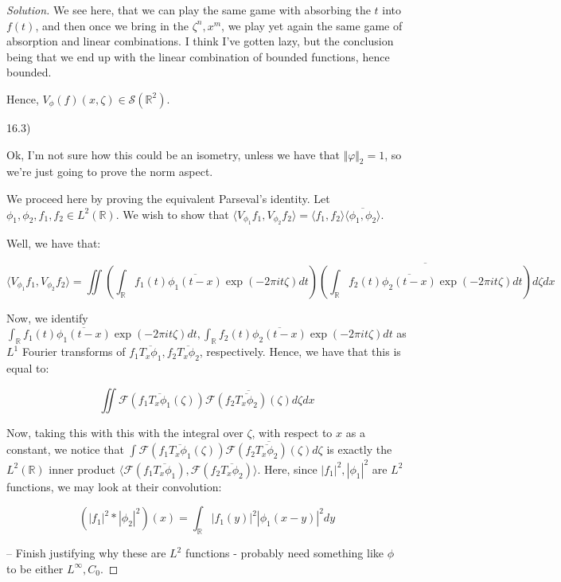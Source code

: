 \documentclass[10pt]{article}
\begin{document}
\begin{proof}[Solution]
We see here, that we can play the same game with absorbing the $t$ into $f(t)$, and then once we bring in the $\zeta^n, x^m$, we play yet again the same game of absorption and linear combinations. I think I've gotten lazy, but the conclusion being that we end up with the linear combination of bounded functions, hence bounded.

Hence, $V_\phi(f)(x, \zeta) \in \mathcal{S}(\mathbb{R}^2)$. 

16.3)

Ok, I'm not sure how this could be an isometry, unless we have that $\Vert \varphi \Vert_2 = 1$, so we're just going to prove the norm aspect.

We proceed here by proving the equivalent Parseval's identity. Let $\phi_1, \phi_2, f_1, f_2 \in L^2(\mathbb{R})$. We wish to show that $\langle V_{\phi_1} f_1, V_{\phi_2} f_2 \rangle = \langle f_1, f_2 \rangle \overline{\langle \phi_1, \phi_2 \rangle}$.

Well, we have that:

$$ \langle V_{\phi_1} f_1, V_{\phi_2} f_2 \rangle = \iint  \left( \int_{\mathbb{R}} f_1(t) \overline{\phi_1(t - x)} \exp( -2 \pi i t \zeta) dt \right) \overline{\left( \int_{\mathbb{R}}  f_2(t) \overline{\phi_2(t - x)} \exp(-2 \pi i t \zeta) dt \right)} d\zeta dx $$

Now, we identify $\int_{\mathbb{R}} f_1(t) \overline{\phi_1(t - x)} \exp( -2 \pi i t \zeta) dt, \int_{\mathbb{R}}  f_2(t) \overline{\phi_2(t - x)} \exp(-2 \pi i t \zeta) dt $ as $L^1$ Fourier transforms of $f_1 \overline{T_x \phi_1}, f_2 \overline{T_x \phi_2}$, respectively. Hence, we have that this is equal to:

$$ \iint \mathcal{F}( f_1 \overline{T_x \phi_1}( \zeta)) \overline{\mathcal{F}(f_2 \overline{T_x \phi_2})(\zeta)} d \zeta dx $$

Now, taking this with this with the integral over $\zeta$, with respect to $x$ as a constant, we notice that $ \int   \mathcal{F}( f_1 \overline{T_x \phi_1}( \zeta)) \overline{\mathcal{F}(f_2 \overline{T_x \phi_2})(\zeta)} d \zeta$ is exactly the $L^2(\mathbb{R})$ inner product $\langle \mathcal{F}( f_1 \overline{T_x \phi_1}), \mathcal{F}(f_2 \overline{T_x \phi_2}) \rangle $. Here, since $|f_1|^2, |\phi_1|^2$ are $L^2$ functions, we may look at their convolution:

$$ (|f_1|^2 \ast |\phi_2|^2)(x) = \int_{\mathbb{R}} |f_1(y)|^2 |\phi_1(x - y)|^2 dy $$

 -- Finish justifying why these are $L^2$ functions - probably need something like $\phi$ to be either $L^\infty, C_0$.
 

\end{proof}
\end{document}
